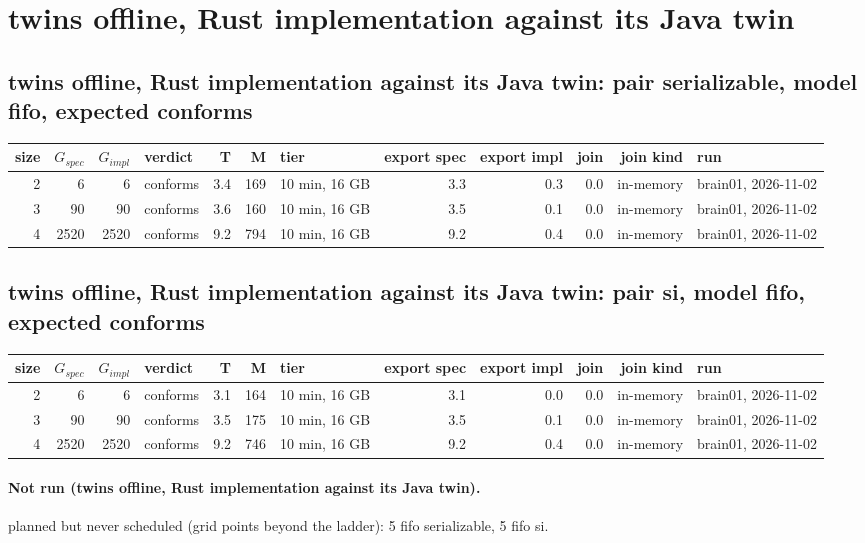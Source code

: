 \documentclass[10pt]{article}
\begin{document}
\section*{twins offline, Rust implementation against its Java twin}
\subsection*{twins offline, Rust implementation against its Java twin: pair \textsf{serializable}, model fifo, expected conforms}
\begin{longtable}{@{}rrrlrrlrrrrl@{}}
\toprule
size & $G_{\mathit{spec}}$ & $G_{\mathit{impl}}$ & verdict & T & M & tier & export spec & export impl & join & join kind & run \\
\midrule
\endhead
\color{red} 2 & 6 & 6 & conforms & 3.4 & 169 & 10 min, 16 GB & 3.3 & 0.3 & 0.0 & in-memory & brain01, 2026-11-02 \\
\color{red} 3 & 90 & 90 & conforms & 3.6 & 160 & 10 min, 16 GB & 3.5 & 0.1 & 0.0 & in-memory & brain01, 2026-11-02 \\
\color{red} 4 & 2520 & 2520 & conforms & 9.2 & 794 & 10 min, 16 GB & 9.2 & 0.4 & 0.0 & in-memory & brain01, 2026-11-02 \\
\bottomrule
\end{longtable}
\subsection*{twins offline, Rust implementation against its Java twin: pair \textsf{si}, model fifo, expected conforms}
\begin{longtable}{@{}rrrlrrlrrrrl@{}}
\toprule
size & $G_{\mathit{spec}}$ & $G_{\mathit{impl}}$ & verdict & T & M & tier & export spec & export impl & join & join kind & run \\
\midrule
\endhead
\color{red} 2 & 6 & 6 & conforms & 3.1 & 164 & 10 min, 16 GB & 3.1 & 0.0 & 0.0 & in-memory & brain01, 2026-11-02 \\
\color{red} 3 & 90 & 90 & conforms & 3.5 & 175 & 10 min, 16 GB & 3.5 & 0.1 & 0.0 & in-memory & brain01, 2026-11-02 \\
\color{red} 4 & 2520 & 2520 & conforms & 9.2 & 746 & 10 min, 16 GB & 9.2 & 0.4 & 0.0 & in-memory & brain01, 2026-11-02 \\
\bottomrule
\end{longtable}
\paragraph{Not run (twins offline, Rust implementation against its Java twin).}
planned but never scheduled (grid points beyond the ladder): 5 fifo serializable, 5 fifo si.\par
\end{document}
